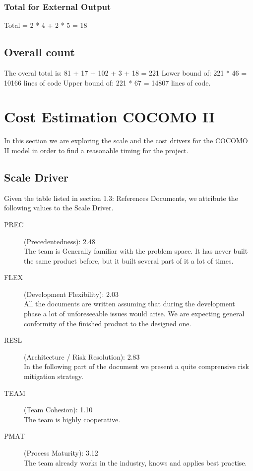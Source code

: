 \documentclass[11pt]{article} %
\begin{document}
\subsubsection{Total for External Output}
Total = 2 * 4 + 2 * 5 = 18

\subsection{Overall count}

The overal total is: 81 + 17 + 102 + 3 + 18 = 221 \newline
Lower bound of: 221 * 46 = {\Large 10166} lines of code \newline
Upper bound of: 221 * 67 = {\Large 14807} lines of code.




\newpage
\section{Cost Estimation COCOMO II}

In this section we are exploring the scale and the cost drivers for the COCOMO II model in order to find a reasonable timing for the project.

\subsection{Scale Driver}

Given the table listed in section 1.3: References Documents, we attribute the following values to the Scale Driver.

\begin{description}
	\item[PREC] (Precedentedness):  {\large 2.48} 
\\ The team is Generally familiar with the problem space. It has never built the same product before, but it built several part of it a lot of times.
	\item[FLEX] (Development Flexibility): {\large 2.03} \\ All the documents are written assuming that during the development phase a lot of unforeseeable issues would arise. We are expecting general conformity of the finished product to the designed one.
	\item[RESL] (Architecture / Risk Resolution): {\large 2.83} \\ In the following part of the document we present a quite comprensive risk mitigation strategy. 
	\item[TEAM] (Team Cohesion): {\large 1.10} \\ The team is highly cooperative. 
	\item[PMAT] (Process Maturity): {\large 3.12} \\ The team already works in the industry, knows and applies best practise.
\end{description}
\end{document}
